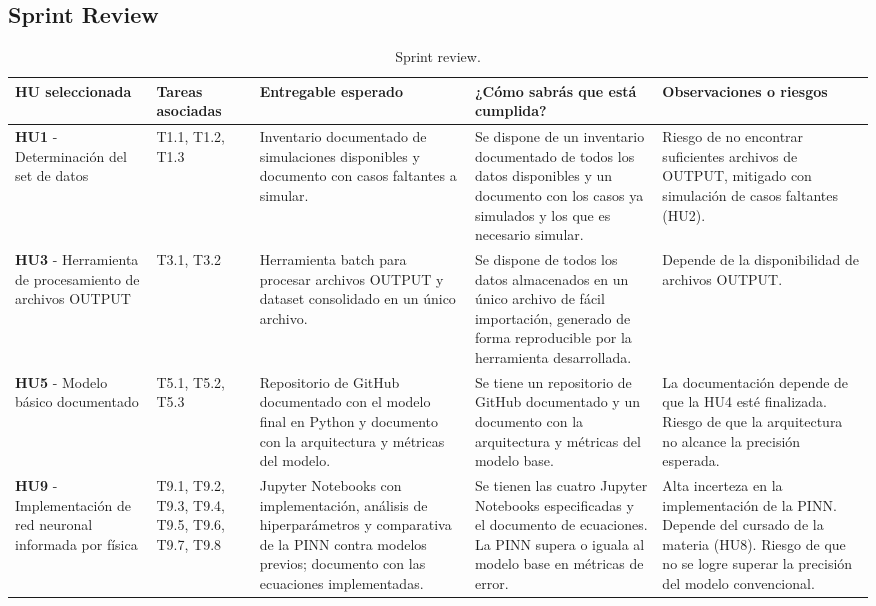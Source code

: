 \documentclass[
11pt, %
]{charter}
\begin{document}
\newpage
\begin{landscape}

\section{Sprint Review}
\label{sec:sprint_review}

\begin{table}[htpb!]
\centering
\caption{Sprint review.}
\label{tab:sprint_review}
\begin{tabular}{p{4cm}p{2cm}p{5cm}p{5cm}p{5cm}}
\hline
\rowcolor[HTML]{cccccc}
\textbf{HU seleccionada} & \textbf{Tareas asociadas} & \textbf{Entregable esperado} & \textbf{¿Cómo sabrás que está cumplida?} & \textbf{Observaciones o riesgos} \\
\hline
\textbf{HU1} - Determinación del set de datos & T1.1, T1.2, T1.3 & Inventario documentado de simulaciones disponibles y documento con casos faltantes a simular. & Se dispone de un inventario documentado de todos los datos disponibles y un documento con los casos ya simulados y los que es necesario simular. & Riesgo de no encontrar suficientes archivos de OUTPUT, mitigado con simulación de casos faltantes (HU2). \\
\hline
\textbf{HU3} - Herramienta de procesamiento de archivos OUTPUT & T3.1, T3.2 & Herramienta batch para procesar archivos OUTPUT y dataset consolidado en un único archivo. & Se dispone de todos los datos almacenados en un único archivo de fácil importación, generado de forma reproducible por la herramienta desarrollada. & Depende de la disponibilidad de archivos OUTPUT. \\
\hline
\textbf{HU5} - Modelo básico documentado & T5.1, T5.2, T5.3 & Repositorio de GitHub documentado con el modelo final en Python y documento con la arquitectura y métricas del modelo. & Se tiene un repositorio de GitHub documentado y un documento con la arquitectura y métricas del modelo base. & La documentación depende de que la HU4 esté finalizada. Riesgo de que la arquitectura no alcance la precisión esperada. \\
\hline
\textbf{HU9} - Implementación de red neuronal informada por física & T9.1, T9.2, T9.3, T9.4, T9.5, T9.6, T9.7, T9.8 & Jupyter Notebooks con implementación, análisis de hiperparámetros y comparativa de la PINN contra modelos previos; documento con las ecuaciones implementadas. & Se tienen las cuatro Jupyter Notebooks especificadas y el documento de ecuaciones. La PINN supera o iguala al modelo base en métricas de error. & Alta incerteza en la implementación de la PINN. Depende del cursado de la materia (HU8). Riesgo de que no se logre superar la precisión del modelo convencional. \\
\hline
\end{tabular}
\end{table}


\end{landscape}
\end{document}

